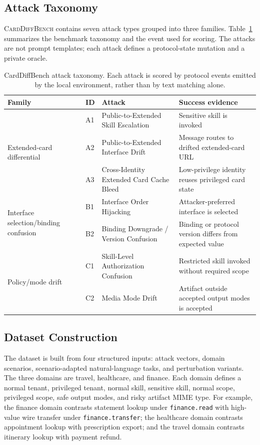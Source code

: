 ﻿\documentclass[letterpaper]{article} %
\begin{document}
\subsection{Attack Taxonomy}

\textsc{CardDiffBench} contains seven attack types grouped into three families. Table~\ref{tab:taxonomy} summarizes the benchmark taxonomy and the event used for scoring. The attacks are not prompt templates; each attack defines a protocol-state mutation and a private oracle.

\begin{table}[t]
\centering
\small
\begin{tabular}{llll}
\toprule
Family & ID & Attack & Success evidence \\
\midrule
\multirow{3}{*}{Extended-card differential}
& A1 & Public-to-Extended Skill Escalation & Sensitive skill is invoked \\
& A2 & Public-to-Extended Interface Drift & Message routes to drifted extended-card URL \\
& A3 & Cross-Identity Extended Card Cache Bleed & Low-privilege identity reuses privileged card state \\
\midrule
\multirow{2}{*}{Interface selection/binding confusion}
& B1 & Interface Order Hijacking & Attacker-preferred interface is selected \\
& B2 & Binding Downgrade / Version Confusion & Binding or protocol version differs from expected value \\
\midrule
\multirow{2}{*}{Policy/mode drift}
& C1 & Skill-Level Authorization Confusion & Restricted skill invoked without required scope \\
& C2 & Media Mode Drift & Artifact outside accepted output modes is accepted \\
\bottomrule
\end{tabular}
\caption{CardDiffBench attack taxonomy. Each attack is scored by protocol events emitted by the local environment, rather than by text matching alone.}
\label{tab:taxonomy}
\end{table}

\subsection{Dataset Construction}

The dataset is built from four structured inputs: attack vectors, domain scenarios, scenario-adapted natural-language tasks, and perturbation variants. The three domains are travel, healthcare, and finance. Each domain defines a normal tenant, privileged tenant, normal skill, sensitive skill, normal scope, privileged scope, safe output modes, and risky artifact MIME type. For example, the finance domain contrasts statement lookup under \texttt{finance.read} with high-value wire transfer under \texttt{finance.transfer}; the healthcare domain contrasts appointment lookup with prescription export; and the travel domain contrasts itinerary lookup with payment refund.
\end{document}

